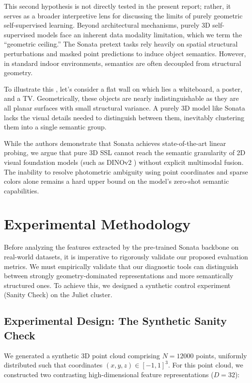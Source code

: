 \documentclass[11pt, a4paper]{article}
\begin{document}
This second hypothesis is not directly tested in the present report; rather, it serves as a broader interpretive lens for discussing the limits of purely geometric self-supervised learning. Beyond architectural mechanisms, purely 3D self-supervised models face an inherent data modality limitation, which we term the ``geometric ceiling.'' The Sonata pretext tasks rely heavily on spatial structural perturbations and masked point predictions to induce object semantics. However, in standard indoor environments, semantics are often decoupled from structural geometry. 

To illustrate this , let's consider a flat wall on which lies a whiteboard, a poster, and a TV. Geometrically, these objects are nearly indistinguishable as they are all planar surfaces with small structural variance. A purely 3D model like Sonata lacks the visual details needed to distinguish between them, inevitably clustering them into a single semantic group. 

While the authors demonstrate that Sonata achieves state-of-the-art linear probing, we argue that pure 3D SSL cannot reach the semantic granularity of 2D visual foundation models (such as DINOv2 \cite{dinov2}) without explicit multimodal fusion. The inability to resolve photometric ambiguity using point coordinates and sparse colors alone remains a hard upper bound on the model's zero-shot semantic capabilities.

\section{Experimental Methodology}


Before analyzing the features extracted by the pre-trained Sonata backbone on real-world datasets, it is imperative to rigorously validate our proposed evaluation metrics. We must empirically validate that our diagnostic tools can distinguish between strongly geometry-dominated representations and more semantically structured ones. To achieve this, we designed a synthetic control experiment (Sanity Check) on the Juliet cluster.

\subsection{Experimental Design: The Synthetic Sanity Check}
We generated a synthetic 3D point cloud comprising $N=12000$ points, uniformly distributed such that coordinates $(x, y, z) \in [-1, 1]^3$. For this point cloud, we constructed two contrasting high-dimensional feature representations ($D=32$):
\end{document}
